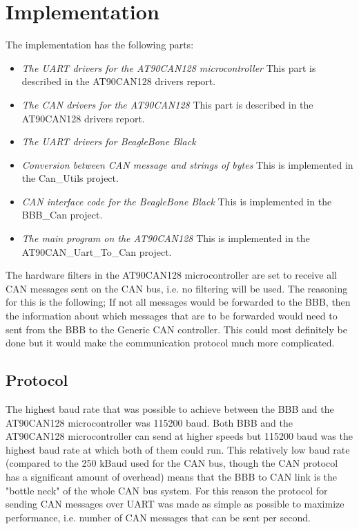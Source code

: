 
\section{Implementation}\label{sec:implementation}
The implementation has the following parts:

\begin{itemize}
   \item { \em The UART drivers for the AT90CAN128 microcontroller} \newline This part is described in the AT90CAN128 drivers report.
   \item { \em The CAN drivers for the AT90CAN128} \newline This part is described in the AT90CAN128 drivers report.
   \item { \em The UART drivers for BeagleBone Black}
   \item { \em Conversion between CAN message and strings of bytes } \newline This is implemented in the Can\_Utils project.
   \item { \em CAN interface code for the BeagleBone Black} \newline This is implemented in the BBB\_Can project.
   \item { \em The main program on the AT90CAN128} \newline This is implemented in the AT90CAN\_Uart\_To\_Can project.
\end{itemize}

The hardware filters in the AT90CAN128 microcontroller are set to receive all CAN messages sent on the CAN bus, i.e. no filtering will be used. The reasoning for this is the following; 
If not all messages would be forwarded to the BBB, then the information about which messages that are to be forwarded would need to sent from the BBB to the Generic CAN controller. This could most definitely be done but it would make the communication protocol much more complicated.

\subsection{Protocol}
The highest baud rate that was possible to achieve between the BBB and the AT90CAN128 microcontroller was 115200 baud. Both BBB and the AT90CAN128 microcontroller can send at higher speeds but 115200 baud was the highest baud rate at which both of them could run. This relatively low baud rate (compared to the 250 kBaud used for the CAN bus, though the CAN protocol has a significant amount of overhead) means that the BBB to CAN link is the "bottle neck" of the whole CAN bus system. For this reason the protocol for sending CAN messages over UART was made as simple as possible to maximize performance, i.e. number of CAN messages that can be sent per second.

